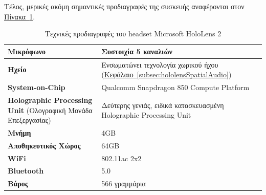 Τέλος, μερικές ακόμη σημαντικές προδιαγραφές της συσκευής αναφέρονται στον \hyperref[table:hololensSpecs]{Πίνακα~\ref*{table:hololensSpecs}}.
\begin{table}[!ht]
    \begin{tabularx}{\textwidth}{|X|X|}
        \hline
        \textbf{Μικρόφωνο} & Συστοιχία 5 καναλιών \\
        \hline
        \textbf{Ηχείο} & Ενσωματώνει τεχνολογία χωρικού ήχου (\hyperref[subsec:hololensSpatialAudio]{Κεφάλαιο~\ref*{subsec:hololensSpatialAudio}}) \\
        \hline
        \textbf{System-on-Chip} & Qualcomm Snapdragon 850 Compute Platform \\
        \hline
        \textbf{Holographic Processing Unit} (Ολογραφική Μονάδα Επεξεργασίας) & Δεύτερης γενιάς, ειδικά κατασκευασμένη Holographic Processing Unit \\
        \hline
        \textbf{Μνήμη} & 4GB \\
        \hline
        \textbf{Αποθηκευτικός Χώρος} & 64GB \\
        \hline
        \textbf{WiFi} & 802.11ac 2x2 \\%
        \hline
        \textbf{Bluetooth} & 5.0 \\
        \hline
        \textbf{Βάρος} & 566 γραμμάρια \\
        \hline
    \end{tabularx}
    \caption{Τεχνικές προδιαγραφές του headset Microsoft HoloLens 2}\label{table:hololensSpecs}
\end{table}

